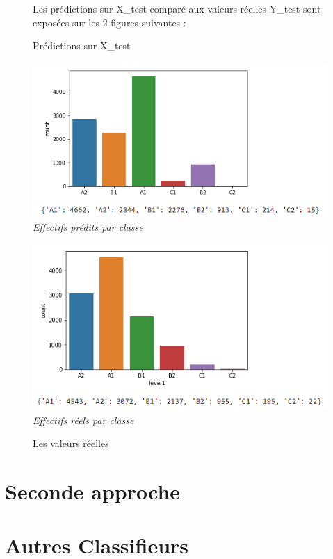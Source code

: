 \documentclass[11pt]{article}
\begin{document}
\begin{figure}[!htb]
Les prédictions sur X\_test comparé aux valeurs réelles Y\_test sont exposées sur les 2 figures suivantes : \\
  \centering
    \caption{Prédictions sur X\_test}
    \includegraphics[width=\textwidth]{predictions.png}
	\textit {Effectifs prédits par classe}
\newline \newline

  \centering
    \caption{Les valeurs réelles}
    \includegraphics[width=\textwidth]{relles.png}
	\textit {Effectifs réels par classe}

\end{figure}



\section{Seconde approche}


\section{Autres Classifieurs}
\end{document}
